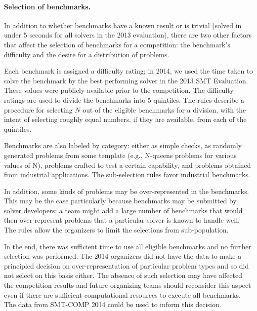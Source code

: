 \documentclass[twosize,11pt]{article}
\begin{document}
\paragraph{Selection of benchmarks.} In addition to whether benchmarks have a known result or is trivial (solved in under 5 seconds for all solvers in the 2013 evaluation), there are two other factors that affect the selection of benchmarks for a competition: the benchmark's difficulty and the desire for a distribution of problems.

Each benchmark is assigned a difficulty rating; in 2014, we used the time taken to solve the benchmark by the best performing solver in the 2013 SMT Evaluation. These values were publicly available prior to the competition. The difficulty ratings are used to divide the benchmarks into 5 quintiles. The rules describe a procedure for selecting $N$ out of the eligible benchmarks for a division, with the intent of selecting roughly equal numbers, if they are available, from each of the quintiles.

Benchmarks are also labeled by category: either as simple checks, as randomly generated problems from some template (e.g., N-queens problems for various values of N), problems crafted to test a certain capability, and problems obtained from industrial applications. The sub-selection rules favor industrial benchmarks.

In addition, some kinds of problems may be over-represented in the benchmarks. This may be the case particularly because benchmarks may be submitted by solver developers; a team might add a large number of benchmarks that would then over-represent problems that a particular solver is known to handle well. The rules allow the organizers to limit the selections from sub-population. 

In the end, there was sufficient time to use all eligible benchmarks and no further selection was performed. The 2014 organizers did not have the data to make a principled decision on over-representation of particular problem types and so did not select on this basis either. The absence of such selection may have affected the competition results and future organizing teams should reconsider this aspect even if there are sufficient computational resources to execute all benchmarks. The data from SMT-COMP 2014 could be used to inform this decision.
\end{document}
